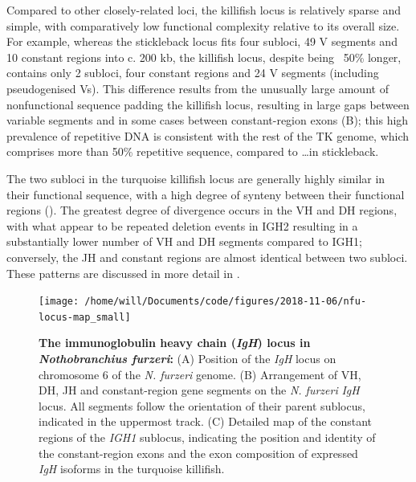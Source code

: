 	Compared to other closely-related loci, the killifish locus is relatively sparse and simple, with comparatively low functional complexity relative to its overall size. For example, whereas the stickleback locus fits four subloci, 49 V segments and 10 constant regions into c. 200 kb, the killifish locus, despite being ~50\% longer, contains only 2 subloci, four constant regions and 24 V segments (including pseudogenised Vs). This difference results from the unusually large amount of nonfunctional sequence padding the killifish locus, resulting in large gaps between variable segments and in some cases between constant-region exons (B); this high prevalence of repetitive DNA is consistent with the rest of the TK genome, which comprises more than 50\% repetitive sequence, compared to \dots in stickleback. %
	
	The two subloci in the turquoise killifish locus are generally highly similar in their functional sequence, with a high degree of synteny between their functional regions (). The greatest degree of divergence occurs in the VH and DH regions, with what appear to be repeated deletion events in IGH2 resulting in a substantially lower number of VH and DH segments compared to IGH1; conversely, the JH and constant regions are almost identical between two subloci. These patterns are discussed in more detail in .
	
	
	\begin{figure}
	\centering
	\texttt{[image: /home/will/Documents/code/figures/2018-11-06/nfu-locus-map\_small]} %
	\caption[The immunoglobulin heavy chain (\textit{IgH}) locus in \textit{Nothobranchius furzeri}]{\textbf{The immunoglobulin heavy chain (\textit{IgH}) locus in \textit{Nothobranchius furzeri}:} (A) Position of the \textit{IgH} locus on chromosome 6 of the \textit{N. furzeri} genome. (B) Arrangement of VH, DH, JH and constant-region gene segments on the \textit{N. furzeri} \textit{IgH} locus. All segments follow the orientation of their parent sublocus, indicated in the uppermost track. (C) Detailed map of the constant regions of the \textit{IGH1} sublocus, indicating the position and identity of the constant-region exons and the exon composition of expressed \textit{IgH} isoforms in the turquoise killifish.}
	\label{fig:nfu-locus-map}
	\end{figure}
	

